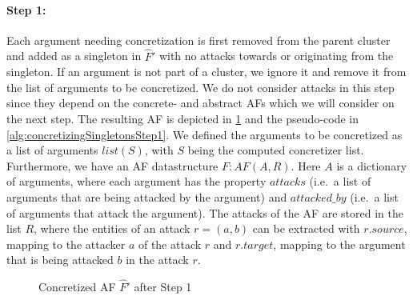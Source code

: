 \paragraph{Step 1:} Each argument needing concretization is first removed from the parent cluster and added as a singleton in $\hat{F}'$ with no attacks towards or originating from the singleton. If an argument is not part of a cluster, we ignore it and remove it from the list of arguments to be concretized.
We do not consider attacks in this step since they depend on the concrete- and abstract AFs which we will consider on the next step. The resulting AF is depicted in \cref{example:algorithmConcretizeSingletonsStep1} and the pseudo-code in \cref{alg:concretizingSingletonsStep1}. We defined the arguments to be concretized as a list of arguments $list(S)$, with $S$ being the computed concretizer list. Furthermore, we have an AF datastructure $F: AF(A, R)$. Here $A$ is a dictionary of arguments, where each argument has the property $attacks$ (i.e.\ a list of arguments that are being attacked by the argument) and $attacked\_by$ (i.e.\ a list of arguments that attack the argument). The attacks of the AF are stored in the list $R$, where the entities of an attack $r=(a, b)$ can be extracted with $r.source$, mapping to the attacker $a$ of the attack $r$ and $r.target$, mapping to the argument that is being attacked $b$ in the attack $r$.


\vspace{0.3cm}
\begin{figure}[h]
    \centering
    \caption{Concretized AF $\hat{F}'$ after Step 1}
    \label{example:algorithmConcretizeSingletonsStep1}
\end{figure}
\vspace{-0.2cm}



